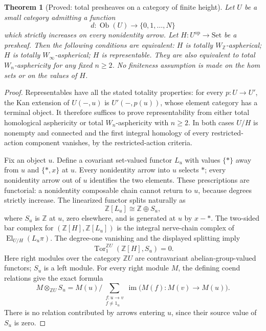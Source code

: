 \documentclass[11pt,a4paper]{article}
\newtheorem{theorem}{Theorem}[section]
\theoremstyle{definition}
\theoremstyle{remark}
\begin{document}
\begin{theorem}[Proved: total presheaves on a category of finite height]\label{A:finite-height}
Let $U$ be a small category admitting a function
\[
 d:\operatorname{Ob}(U)\longrightarrow\{0,1,\ldots,N\}
\]
which strictly increases on every nonidentity arrow. Let $H:U^{\mathrm{op}}\to\mathrm{Set}$ be a presheaf. Then the following conditions are equivalent: $H$ is totally $W_{\mathbb Z}$-aspherical; $H$ is totally $W_\infty$-aspherical; $H$ is representable. They are also equivalent to total $W_n$-asphericity for any fixed $n\geq2$. No finiteness assumption is made on the hom sets or on the values of $H$.
\end{theorem}
\begin{proof}
Representables have all the stated totality properties: for every $p:U\to U'$, the Kan extension of $U(-,u)$ is $U'(-,p(u))$, whose element category has a terminal object. It therefore suffices to prove representability from either total homological asphericity or total $W_n$-asphericity with $n\geq2$. In both cases $U/H$ is nonempty and connected and the first integral homology of every restricted-action component vanishes, by the restricted-action criteria.

Fix an object $u$. Define a covariant set-valued functor $L_u$ with values $\{*\}$ away from $u$ and $\{*,x\}$ at $u$. Every nonidentity arrow into $u$ selects $*$; every nonidentity arrow out of $u$ identifies the two elements. These prescriptions are functorial: a nonidentity composable chain cannot return to $u$, because degrees strictly increase. The linearized functor splits naturally as
\[
 \mathbb Z[L_u]\cong\mathbb Z\oplus S_u,
\]
where $S_u$ is $\mathbb Z$ at $u$, zero elsewhere, and is generated at $u$ by $x-*$. The two-sided bar complex for $(\mathbb Z[H],\mathbb Z[L_u])$ is the integral nerve-chain complex of $\operatorname{El}_{U/H}(L_u\pi)$. The degree-one vanishing and the displayed splitting imply
\[
 \operatorname{Tor}^{\mathbb ZU}_1(\mathbb Z[H],S_u)=0.
\tag{$\ast$}
\]
Here right modules over the category $\mathbb ZU$ are contravariant abelian-group-valued functors; $S_u$ is a left module. For every right module $M$, the defining coend relations give the exact formula
\[
 M\otimes_{\mathbb ZU}S_u
 =M(u)\bigg/\sum_{\substack{f:u\to v\\f\ne1_u}}\operatorname{im}\bigl(M(f):M(v)\to M(u)\bigr).
\tag{$\ast\ast$}
\]
There is no relation contributed by arrows entering $u$, since their source value of $S_u$ is zero.


\end{proof}
\end{document}
